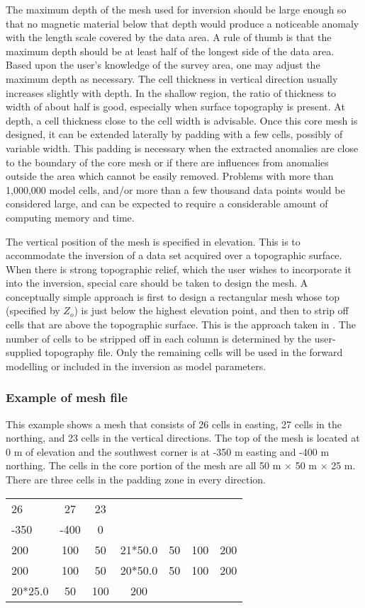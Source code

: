The maximum depth of the mesh used for inversion should be large enough so that no magnetic material below that depth would produce a noticeable anomaly with the length scale covered by the data area. A rule of thumb is that the maximum depth should be at least half of the longest side of the data area. Based upon the user's knowledge of the survey area, one may adjust the maximum depth as necessary. The cell thickness in vertical direction usually increases slightly with depth. In the shallow region, the ratio of thickness to width of about half is good, especially when surface topography is present. At depth, a cell thickness close to the cell width is advisable. Once this core mesh is designed, it can be extended laterally by padding with a few cells, possibly of variable width. This padding is necessary when the extracted anomalies are close to the boundary of the core mesh or if there are influences from anomalies outside the area which cannot be easily removed. Problems with more than 1,000,000 model cells, and/or more than a few thousand data points would be considered large, and can be expected to require a considerable amount of computing memory and time.

The vertical position of the mesh is specified in elevation. This is to accommodate the inversion of a data set acquired over a topographic surface. When there is strong topographic relief, which the user wishes to incorporate it into the inversion, special care should be taken to design the mesh. A conceptually simple approach is first to design a rectangular mesh whose top (specified by $Z_o$) is just below the highest elevation point, and then to strip off cells that are above the topographic surface. This is the approach taken in \prog. The number of cells to be stripped off in each column is determined by the user-supplied topography file. Only the remaining cells will be used in the forward modelling or included in the inversion as model parameters.

\subsubsection*{Example of mesh file}

This example shows a mesh that consists of 26 cells in easting, 27 cells in the northing, and 23 cells in the vertical directions. The top of the mesh is located at 0 m of elevation and the southwest corner is at -350 m easting and -400 m northing. The cells in the core portion of the mesh are all 50 m $\times$ 50 m $\times$ 25 m. There are three cells in the padding zone in every direction.
%
\begin{fileExample}
\begin{tabular}{|lcccccc|}
\hline
26   &   27 & 23 &         &    &     & \\
-350 & -400 & 0  &         &    &     & \\
200  & 100  & 50 & 21*50.0 & 50 & 100 & 200 \\
200  & 100  & 50 & 20*50.0 & 50 & 100 & 200 \\
20*25.0 & 50 & 100 & 200   &    &     & \\
\hline
\end{tabular}
\end{fileExample}

